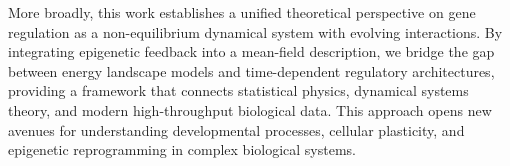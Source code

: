 \documentclass[reprint,amsmath,amssymb,aps]{revtex4-2}
\begin{document}
More broadly, this work establishes a unified theoretical perspective on gene regulation as a non-equilibrium dynamical system with evolving interactions. By integrating epigenetic feedback into a mean-field description, we bridge the gap between energy landscape models and time-dependent regulatory architectures, providing a framework that connects statistical physics, dynamical systems theory, and modern high-throughput biological data. This approach opens new avenues for understanding developmental processes, cellular plasticity, and epigenetic reprogramming in complex biological systems.



\end{document}
